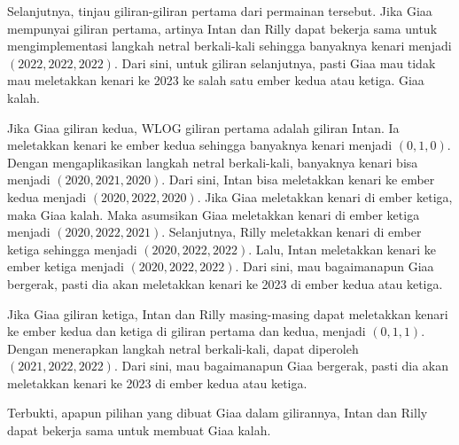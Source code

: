 \documentclass[12pt]{scrartcl}
\begin{document}
\begin{enumerate}[resume]
\begin{solusi}
        Selanjutnya, tinjau giliran-giliran pertama dari permainan tersebut. Jika Giaa mempunyai giliran pertama, artinya Intan dan Rilly dapat bekerja sama untuk mengimplementasi langkah netral berkali-kali sehingga banyaknya kenari menjadi $(2022,2022,2022)$. Dari sini, untuk giliran selanjutnya, pasti Giaa mau tidak mau meletakkan kenari ke 2023 ke salah satu ember kedua atau ketiga. Giaa kalah.

        Jika Giaa giliran kedua, WLOG giliran pertama adalah giliran Intan. Ia meletakkan kenari ke ember kedua sehingga banyaknya kenari menjadi $(0,1,0)$. Dengan mengaplikasikan langkah netral berkali-kali, banyaknya kenari bisa menjadi $(2020,2021,2020)$. Dari sini, Intan bisa meletakkan kenari ke ember kedua menjadi $(2020,2022,2020)$. Jika Giaa meletakkan kenari di ember ketiga, maka Giaa kalah. Maka asumsikan Giaa meletakkan kenari di ember ketiga menjadi $(2020,2022,2021)$. Selanjutnya, Rilly meletakkan kenari di ember ketiga sehingga menjadi $(2020,2022,2022)$. Lalu, Intan meletakkan kenari ke ember ketiga menjadi $(2020,2022,2022)$. Dari sini, mau bagaimanapun Giaa bergerak, pasti dia akan meletakkan kenari ke 2023 di ember kedua atau ketiga.

        Jika Giaa giliran ketiga, Intan dan Rilly masing-masing dapat meletakkan kenari ke ember kedua dan ketiga di giliran pertama dan kedua, menjadi $(0,1,1)$. Dengan menerapkan langkah netral berkali-kali, dapat diperoleh $(2021,2022,2022)$. Dari sini, mau bagaimanapun Giaa bergerak, pasti dia akan meletakkan kenari ke 2023 di ember kedua atau ketiga.

        Terbukti, apapun pilihan yang dibuat Giaa dalam gilirannya, Intan dan Rilly dapat bekerja sama untuk membuat Giaa kalah.
    \end{solusi}
\end{enumerate}
\end{document}
